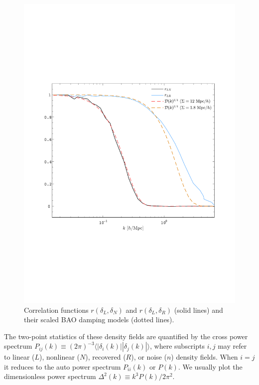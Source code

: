 \documentclass[aps,prd,twocolumn,superscriptaddress,amsfont,amssymb,amsmath,nofootinbib,showpacs,balancelastpage]{revtex4-1}
\begin{document}
\begin{figure}[t] \centering
  \includegraphics[width=1.0\linewidth]{filter.pdf}
  \caption{Correlation functions $r(\delta_L,\delta_N)$ and $r(\delta_L,\delta_R)$
  (solid lines) and their scaled BAO damping models (dotted lines).}
  \label{fig.corr}
\end{figure}


The two-point statistics of these density fields are quantified by the cross power 
spectrum $P_{ij}(k)\equiv(2\pi)^{-3}\langle|\delta_i(k)||\delta_j(k)|\rangle$, 
where subscripts $i,j$ may refer to linear ($L$), nonlinear ($N$),
recovered ($R$), or noise ($n$) density 
fields. When $i=j$ it reduces to the auto power spectrum $P_{ii}(k)$ or $P(k)$. We 
usually plot the dimensionless power spectrum $\Delta^2(k)\equiv k^3P(k)/2\pi^2$. 
\end{document}
